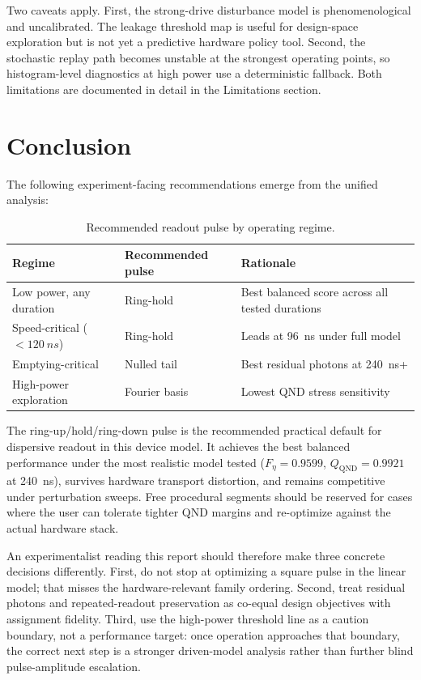 \documentclass[aps,pra,twocolumn,reprint,amsmath,amssymb]{revtex4-2}
\begin{document}
Two caveats apply. First, the strong-drive disturbance model is phenomenological and uncalibrated. The leakage threshold map is useful for design-space exploration but is not yet a predictive hardware policy tool. Second, the stochastic replay path becomes unstable at the strongest operating points, so histogram-level diagnostics at high power use a deterministic fallback. Both limitations are documented in detail in the Limitations section.

\section{Conclusion}

The following experiment-facing recommendations emerge from the unified analysis:

\begin{table}[tp]
\centering
\caption{Recommended readout pulse by operating regime.}
\begin{tabular}{@{} l l l @{}}
\toprule
Regime & Recommended pulse & Rationale \\
\midrule
Low power, any duration & Ring-hold & Best balanced score across all tested durations \\
Speed-critical ($<\SI{120}{ns}$) & Ring-hold & Leads at \SI{96}{ns} under full model \\
Emptying-critical & Nulled tail & Best residual photons at \SI{240}{ns}+ \\
High-power exploration & Fourier basis & Lowest QND stress sensitivity \\
\bottomrule
\end{tabular}
\end{table}

The ring-up/hold/ring-down pulse is the recommended practical default for dispersive readout in this device model. It achieves the best balanced performance under the most realistic model tested ($F_\eta=0.9599$, $Q_\mathrm{QND}=0.9921$ at \SI{240}{ns}), survives hardware transport distortion, and remains competitive under perturbation sweeps. Free procedural segments should be reserved for cases where the user can tolerate tighter QND margins and re-optimize against the actual hardware stack.

An experimentalist reading this report should therefore make three concrete decisions differently. First, do not stop at optimizing a square pulse in the linear model; that misses the hardware-relevant family ordering. Second, treat residual photons and repeated-readout preservation as co-equal design objectives with assignment fidelity. Third, use the high-power threshold line as a caution boundary, not a performance target: once operation approaches that boundary, the correct next step is a stronger driven-model analysis rather than further blind pulse-amplitude escalation.
\end{document}
